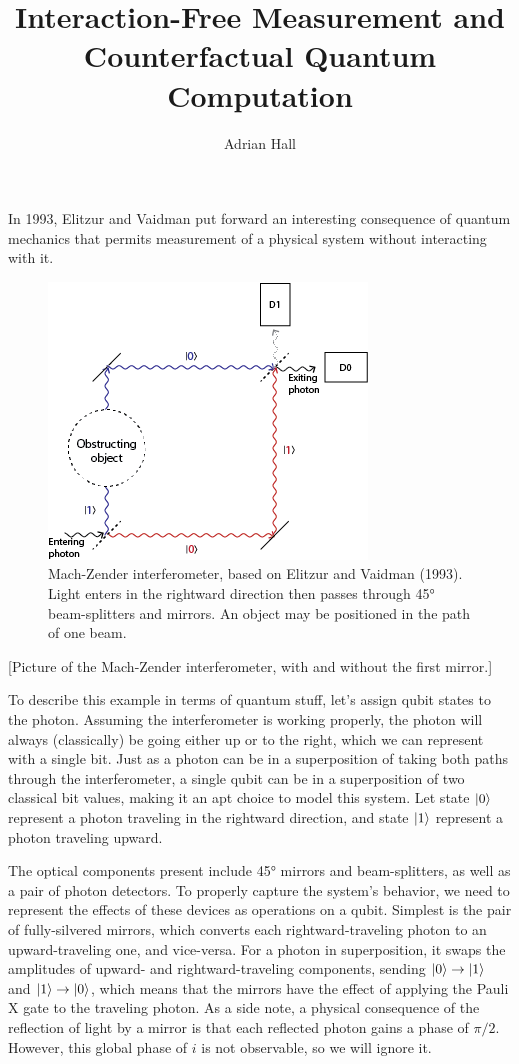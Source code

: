 \documentclass{article}
\author{Adrian Hall}
\title{Interaction-Free Measurement and Counterfactual Quantum Computation}
\newcommand{\X}{\text{X}}
\begin{document}
\maketitle

In 1993, Elitzur and Vaidman put forward an interesting consequence of quantum mechanics that permits measurement of a physical system without interacting with it.

\begin{figure}
\includegraphics[scale=0.7]{mach-zender}
\centering
\caption{Mach-Zender interferometer, based on Elitzur and Vaidman (1993). Light enters in the rightward direction then passes through 45° beam-splitters and mirrors. An object may be positioned in the path of one beam.}
\end{figure}

[Picture of the Mach-Zender interferometer, with and without the first mirror.]

To describe this example in terms of quantum stuff, let's assign qubit states to the photon. Assuming the interferometer is working properly, the photon will always (classically) be going either up or to the right, which we can represent with a single bit. Just as a photon can be in a superposition of taking both paths through the interferometer, a single qubit can be in a superposition of two classical bit values, making it an apt choice to model this system. Let state $\ket 0$ represent a photon traveling in the rightward direction, and state $\ket 1$ represent a photon traveling upward.

The optical components present include 45° mirrors and beam-splitters, as well as a pair of photon detectors. To properly capture the system's behavior, we need to represent the effects of these devices as operations on a qubit. Simplest is the pair of fully-silvered mirrors, which converts each rightward-traveling photon to an upward-traveling one, and vice-versa. For a photon in superposition, it swaps the amplitudes of upward- and rightward-traveling components, sending $\ket 0 \to \ket 1$ and $\ket 1 \to \ket 0$, which means that the mirrors have the effect of applying the Pauli $\X$ gate to the traveling photon. As a side note, a physical consequence of the reflection of light by a mirror is that each reflected photon gains a phase of $\pi/2$. However, this global phase of $i$ is not observable, so we will ignore it.
\end{document}
